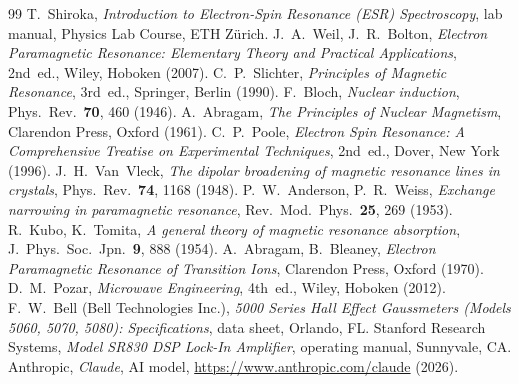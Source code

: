 \begin{thebibliography}{99}\setlength{\itemsep}{1pt}
 T.~Shiroka, \emph{Introduction to Electron-Spin Resonance (ESR) Spectroscopy}, lab manual,
  Physics Lab Course, ETH Zürich.
 J.~A.~Weil, J.~R.~Bolton, \emph{Electron Paramagnetic Resonance: Elementary Theory and Practical
  Applications}, 2nd~ed., Wiley, Hoboken (2007).
 C.~P.~Slichter, \emph{Principles of Magnetic Resonance}, 3rd~ed., Springer, Berlin (1990).
 F.~Bloch, \emph{Nuclear induction}, Phys.\ Rev.\ \textbf{70}, 460 (1946).
 A.~Abragam, \emph{The Principles of Nuclear Magnetism}, Clarendon Press, Oxford (1961).
 C.~P.~Poole, \emph{Electron Spin Resonance: A Comprehensive Treatise on Experimental Techniques},
  2nd~ed., Dover, New York (1996).
 J.~H.~Van~Vleck, \emph{The dipolar broadening of magnetic resonance lines in crystals},
  Phys.\ Rev.\ \textbf{74}, 1168 (1948).
 P.~W.~Anderson, P.~R.~Weiss, \emph{Exchange narrowing in paramagnetic resonance},
  Rev.\ Mod.\ Phys.\ \textbf{25}, 269 (1953).
 R.~Kubo, K.~Tomita, \emph{A general theory of magnetic resonance absorption},
  J.\ Phys.\ Soc.\ Jpn.\ \textbf{9}, 888 (1954).
 A.~Abragam, B.~Bleaney, \emph{Electron Paramagnetic Resonance of Transition Ions},
  Clarendon Press, Oxford (1970).
 D.~M.~Pozar, \emph{Microwave Engineering}, 4th~ed., Wiley, Hoboken (2012).
 F.~W.~Bell (Bell Technologies Inc.), \emph{5000 Series Hall Effect Gaussmeters (Models 5060, 5070,
  5080): Specifications}, data sheet, Orlando, FL.
 Stanford Research Systems, \emph{Model SR830 DSP Lock-In Amplifier}, operating manual, Sunnyvale, CA.
 Anthropic, \emph{Claude}, AI model, \url{https://www.anthropic.com/claude} (2026).
\end{thebibliography}
